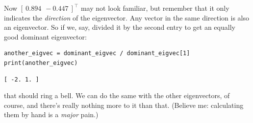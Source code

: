 Now $[\ 0.894\ \ -0.447\ ]^\intercal$ may not look familiar, but remember that
it only indicates the \textit{direction} of the eigenvector. Any vector in the
same direction is also an eigenvector. So if we, say, divided it by the second
entry to get an equally good dominant eigenvector:

\begin{Verbatim}[fontsize=\small,samepage=true,frame=single,framesep=3mm]
another_eigvec = dominant_eigvec / dominant_eigvec[1]
print(another_eigvec)
\end{Verbatim}
\vspace{-.2in}

\begin{Verbatim}[fontsize=\small,samepage=true,frame=leftline,framesep=5mm,framerule=1mm]
[ -2. 1. ]
\end{Verbatim}

that should ring a bell. We can do the same with the other eigenvectors, of
course, and there's really nothing more to it than that. (Believe me:
calculating them by hand is a \textit{major} pain.)
